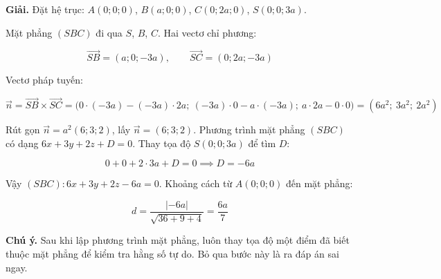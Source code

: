 \documentclass[11pt, a4paper]{article}
\begin{document}
\begin{dapan}[2 — Đáp án A]
\textbf{Giải.} Đặt hệ trục: $A(0;0;0)$, $B(a;0;0)$, $C(0;2a;0)$, $S(0;0;3a)$.

Mặt phẳng $(SBC)$ đi qua $S$, $B$, $C$. Hai vectơ chỉ phương:

$$\vec{SB} = (a;0;-3a), \qquad \vec{SC} = (0;2a;-3a)$$

Vectơ pháp tuyến:

$$\vec{n} = \vec{SB} \times \vec{SC} = \big(0 \cdot (-3a) - (-3a) \cdot 2a;\ (-3a) \cdot 0 - a \cdot (-3a);\ a \cdot 2a - 0 \cdot 0\big) = (6a^2;\ 3a^2;\ 2a^2)$$

Rút gọn $\vec{n} = a^2(6;3;2)$, lấy $\vec{n} = (6;3;2)$. Phương trình mặt phẳng $(SBC)$ có dạng $6x + 3y + 2z + D = 0$. Thay tọa độ $S(0;0;3a)$ để tìm $D$:

$$0 + 0 + 2 \cdot 3a + D = 0 \implies D = -6a$$

Vậy $(SBC): 6x + 3y + 2z - 6a = 0$. Khoảng cách từ $A(0;0;0)$ đến mặt phẳng:

$$d = \frac{|{-6a}|}{\sqrt{36+9+4}} = \frac{6a}{7}$$

\textbf{Chú ý.} Sau khi lập phương trình mặt phẳng, luôn thay tọa độ một điểm đã biết thuộc mặt phẳng để kiểm tra hằng số tự do. Bỏ qua bước này là ra đáp án sai ngay.
\end{dapan}
\end{document}
